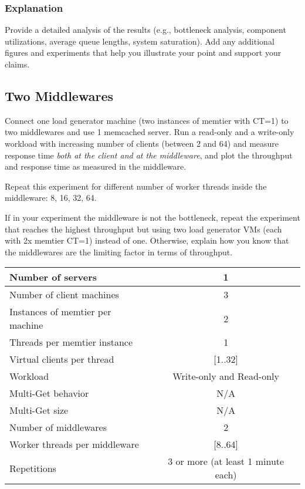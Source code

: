 \documentclass[11pt,a4paper]{article}
\begin{document}
\subsubsection{Explanation}

Provide a detailed analysis of the results (e.g., bottleneck analysis, component utilizations, average queue lengths, system saturation). Add any additional figures and experiments that help you illustrate your point and support your claims.

\subsection{Two Middlewares}

Connect one load generator machine (two instances of memtier with CT=1) to two middlewares and use 1 memcached server. Run a read-only and a write-only workload with increasing number of clients (between 2 and 64) and measure response time \emph{both at the client and at the middleware}, and plot the throughput and response time as measured in the middleware.

Repeat this experiment for different number of worker threads inside the middleware: 8, 16, 32, 64.

If in your experiment the middleware is not the bottleneck, repeat the experiment that reaches the highest throughput but using two load generator VMs (each with 2x memtier CT=1) instead of one. Otherwise, explain how you know that the middlewares are the limiting factor in terms of throughput.

\begin{center}
	\scriptsize{
		\begin{tabular}{|l|c|}
			\hline Number of servers                & 1                        \\ 
			\hline Number of client machines        & 3                        \\ 
			\hline Instances of memtier per machine & 2                        \\ 
			\hline Threads per memtier instance     & 1                        \\
			\hline Virtual clients per thread       & [1..32]                  \\ 
			\hline Workload                         & Write-only and Read-only \\
			\hline Multi-Get behavior               & N/A                      \\
			\hline Multi-Get size                   & N/A                      \\
			\hline Number of middlewares            & 2                        \\
			\hline Worker threads per middleware    & [8..64]                  \\
			\hline Repetitions                      & 3 or more (at least 1 minute each)                \\ 
			\hline 
		\end{tabular}
	} 
\end{center}
\end{document}
